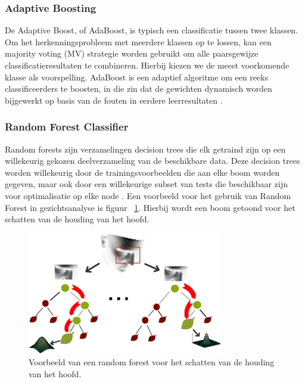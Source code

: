 \subsubsection{Adaptive Boosting}
\label{subsub:adaboost}
De Adaptive Boost, of AdaBoost, is typisch een classificatie tussen twee klassen. Om het herkenningsprobleem met meerdere klassen op te lossen, kan een majority voting (MV) strategie worden gebruikt om alle paarsgewijze classificatieresultaten te combineren. Hierbij kiezen we de meest voorkomende klasse als voorspelling. AdaBoost is een adaptief algoritme om een reeks classificeerders te boosten, in die zin dat de gewichten dynamisch worden bijgewerkt op basis van de fouten in eerdere leerresultaten \autocite{Guo2001}.

\subsubsection{Random Forest Classifier}
\label{subsub:randomforest}
Random forests zijn verzamelingen decision trees die elk getraind zijn op een willekeurig gekozen deelverzameling van de beschikbare data. Deze decision trees worden willekeurig door de trainingsvoorbeelden die aan elke boom worden gegeven,  maar ook door een willekeurige subset van tests die beschikbaar zijn voor optimalisatie op elke node \autocite{Fanelli2012}. 
Een voorbeeld voor het gebruik van Random Forest in gezichtsanalyse is figuur {~\ref{fig:randomforest}}. Hierbij wordt een boom getoond voor het  schatten van de houding van het hoofd. 
\begin{figure}
    \centering
    \includegraphics[width=\columnwidth]{graphics/headposition.png}
    \caption{\label{fig:randomforest}Voorbeeld van een random forest voor het schatten van de houding van het hoofd\autocite{Fanelli2012}.}
\end{figure}

